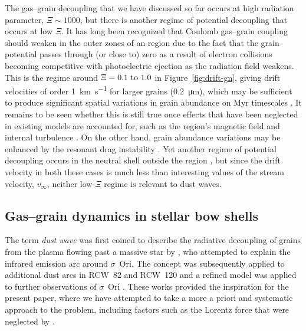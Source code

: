 The gas--grain decoupling that we have discussed so far occurs at high
radiation parameter, \(\Xi \sim 1000\), but there is another regime of
potential decoupling that occurs at low \(\Xi\).  It has long been
recognized \citep{Gail:1979a} that Coulomb gas--grain coupling should
weaken in the outer zones of an \hii{} region due to the fact that the
grain potential passes through (or close to) zero as a result of
electron collisions becoming competitive with photoelectric ejection
as the radiation field weakens.  This is the regime around
\(\Xi = \text{\numrange{0.1}{1.0}}\) in Figure~\ref{fig:drift-gn},
giving drift velocities of order \SI{1}{km.s^{-1}} for larger grains
(\SI{0.2}{\um}), which may be sufficient to produce significant
spatial variations in grain abundance on Myr timescales
\citep{Ishiki:2018a}. It remains to be seen whether this is still true
once effects that have been neglected in existing models are accounted
for, such as the \hii{} region's magnetic field \citep{Krumholz:2007a,
  Arthur:2011a, Gendelev:2012a} and internal turbulence
\citep{Arthur:2016a}.  On the other hand, grain abundance variations
may be enhanced by the resonant drag instability \citep{Squire:2018a,
  Hopkins:2018a}.  Yet another regime of potential decoupling occurs
in the neutral shell outside the \hii{} region
\citep{Gustafsson:2018a}, but since the drift velocity in both these
cases is much less than interesting values of the stream velocity,
\(v_\infty\), neither low-\(\Xi\) regime is relevant to dust waves.

\subsection{Gas--grain dynamics in stellar bow shells}
\label{sec:gas-grain-dynamics-bs}

The term \textit{dust wave} was first coined to describe the
radiative decoupling of grains from the plasma flowing past a massive
star by \citet{Ochsendorf:2014b}, who attempted to explain the
infrared emission arc around \(\sigma\)~Ori.  The concept was subsequently
applied to additional dust arcs in RCW~82 and RCW~120
\citep{Ochsendorf:2014a} and a refined model was applied to further
observations of \(\sigma\)~Ori \citep{Ochsendorf:2015a}.  These works
provided the inspiration for the present paper, where we have
attempted to take a more a priori and systematic approach to the
problem, including factors such as the Lorentz force that were
neglected by \citeauthor{Ochsendorf:2014b}.

